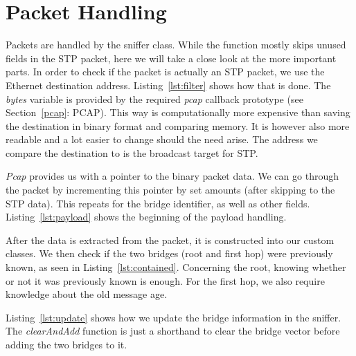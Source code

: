 \section{Packet Handling}
\label{packet_handling}
Packets are handled by the sniffer class.
While the function mostly skips unused fields in the STP packet, here we will take a close look at the more important parts.
In order to check if the packet is actually an STP packet, we use the Ethernet destination address.
Listing~\ref{lst:filter} shows how that is done.
The \textit{bytes} variable is provided by the required \textit{pcap} callback prototype (see Section~\ref{pcap}: PCAP).
This way is computationally more expensive than saving the destination in binary format and comparing memory.
It is however also more readable and a lot easier to change should the need arise.
The address we compare the destination to is the broadcast target for STP.


\textit{Pcap} provides us with a pointer to the binary packet data.
We can go through the packet by incrementing this pointer by set amounts (after skipping to the STP data).
This repeats for the bridge identifier, as well as other fields.
Listing~\ref{lst:payload} shows the beginning of the payload handling.


After the data is extracted from the packet, it is constructed into our custom classes.
We then check if the two bridges (root and first hop) were previously known, as seen in Listing~\ref{lst:contained}.
Concerning the root, knowing whether or not it was previously known is enough.
For the first hop, we also require knowledge about the old message age.


Listing~\ref{lst:update} shows how we update the bridge information in the sniffer.
The \textit{clearAndAdd} function is just a shorthand to clear the bridge vector before adding the two bridges to it.


